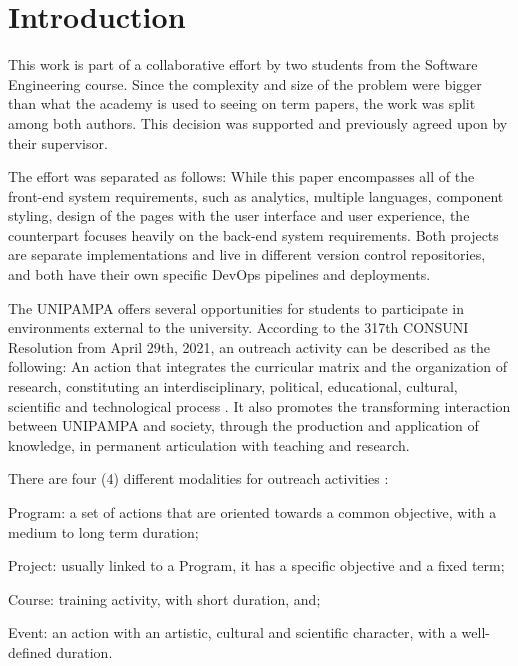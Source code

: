 \chapter{Introduction}\label{introduction}

This work is part of a collaborative effort by two students from the Software Engineering course. Since the complexity and size of the problem were bigger than what the academy is used to seeing on term papers, the work was split among both authors. This decision was supported and previously agreed upon by their supervisor.

The effort was separated as follows: While this paper encompasses all of the front-end system requirements, such as analytics, multiple languages, component styling, design of the pages with the user interface and user experience, the counterpart focuses heavily on the back-end system requirements. Both projects are separate implementations and live in different version control repositories, and both have their own specific DevOps pipelines and deployments.

The \acl{UNIPAMPA} offers several opportunities for students to participate in environments external to the university. According to the 317th CONSUNI Resolution from April 29th, 2021, an outreach activity can be described as the following: An action that integrates the curricular matrix and the organization of research, constituting an interdisciplinary, political, educational, cultural, scientific and technological process . It also promotes the transforming interaction between \ac{UNIPAMPA} and society, through the production and application of knowledge, in permanent articulation with teaching and research.

There are four (4) different modalities for outreach activities :
\begin{inparaenum}[(i)]
  \item Program: a set of actions that are oriented towards a common objective, with a medium to long term duration;
  \item Project: usually linked to a Program, it has a specific objective and a fixed term;
  \item Course: training activity, with short duration, and;
  \item Event: an action with an artistic, cultural and scientific character, with a well-defined duration.
\end{inparaenum}

